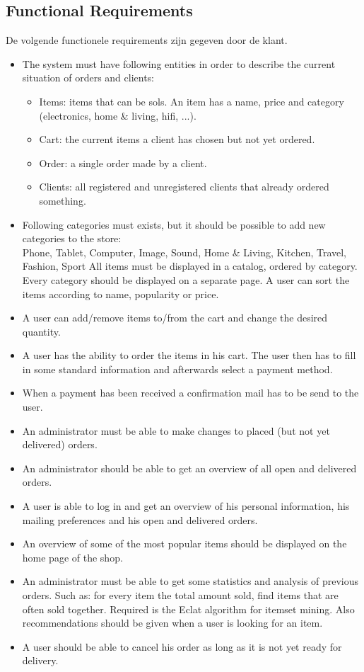 \documentclass[•]{article}
\begin{document}
\subsection{Functional Requirements}
De volgende functionele requirements zijn gegeven door de klant.
\begin{itemize}
\item The system must have following entities in order to describe the current
situation of orders and clients:
\begin{itemize}
\item Items: items that can be sols. An item has a name, price and category (electronics, home \& living, hifi, ...).
\item Cart: the current items a client has chosen but not yet ordered.
\item Order: a single order made by a client.
\item Clients: all registered and unregistered clients that already ordered
something.
\end{itemize}
\item Following categories must exists, but it should be possible to add new
categories to the store:\\
Phone, Tablet, Computer, Image, Sound, Home \& Living, Kitchen, Travel,
Fashion, Sport
All items must be displayed in a catalog, ordered by category. Every
category should be displayed on a separate page. A user can sort the
items according to name, popularity or price.
\item A user can add/remove items to/from the cart and change the desired
quantity.
\item A user has the ability to order the items in his cart. The user then has to
fill in some standard information and afterwards select a payment method.
\item When a payment has been received a confirmation mail has to be send to
the user.
\item An administrator must be able to make changes to placed (but not yet
delivered) orders.
\item An administrator should be able to get an overview of all open and delivered orders.
\item A user is able to log in and get an overview of his personal information,
his mailing preferences and his open and delivered orders.
\item An overview of some of the most popular items should be displayed on
the home page of the shop.
\item An administrator must be able to get some statistics and analysis of previous orders. Such as: for every item the total amount sold, find items
that are often sold together. Required is the Eclat algorithm for itemset
mining. Also recommendations should be given when a user is looking for
an item.
\item A user should be able to cancel his order as long as it is not yet ready for delivery.

\end{itemize}
\end{document}
